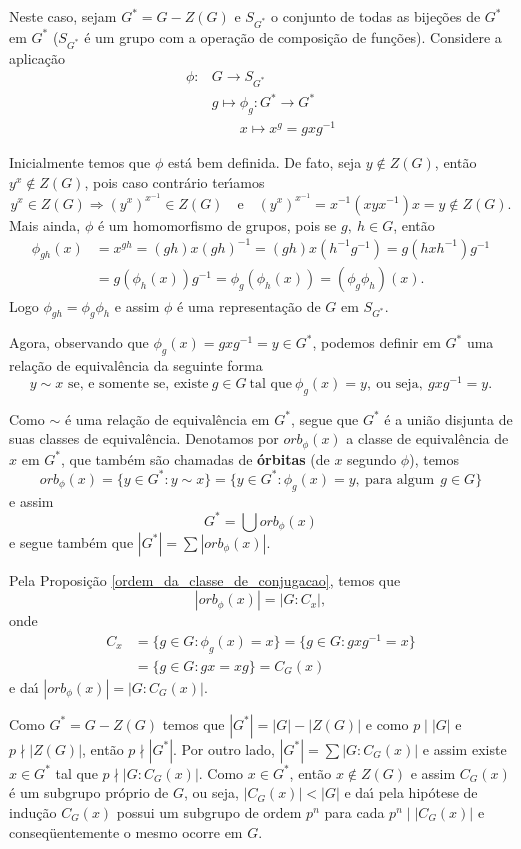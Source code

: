 \begin{prova}
Neste caso, sejam $G^* = G - Z(G)$ e $S_{G^*}$ o conjunto de todas as
bije{\c c}{\~o}es de $G^*$ em $G^*$ ($S_{G^*}$ {\'e} um grupo com a opera{\c
c}{\~a}o de composi{\c c}{\~a}o de fun{\c c}{\~o}es). Considere a
aplica{\c c}{\~a}o
\begin{align*}
\phi : & G \to S_{G^*}\\
&g \mapsto \phi_g : G^* \to G^*\\
&\qquad x \mapsto x^g = gxg^{-1}
\end{align*}

Inicialmente temos que $\phi$ est{\'a} bem definida. De fato, seja $y \notin
Z(G)$, ent{\~a}o $y^x \notin Z(G)$, pois caso contr{\'a}rio
ter{\'\i}amos
\[
y^x \in Z(G) \Rightarrow (y^x)^{x^{-1}} \in Z(G) \quad
\text{e}\quad (y^x)^{x^{-1}} = x^{-1}(xyx^{-1})x = y \notin Z(G).
\]
Mais ainda, $\phi$ {\'e} um homomorfismo de grupos, pois se $g,\ h \in G$,
ent{\~a}o 
\begin{align*}
\phi_{gh} (x) &= x^{gh} =
(gh)x(gh)^{-1} = (gh)x(h^{-1}g^{-1}) = g(hxh^{-1})g^{-1} \\&=
g(\phi_h (x))g^{-1} = \phi_g (\phi_h (x)) = (\phi_g \phi_h)(x).
\end{align*}
Logo $\phi_{gh} = \phi_g \phi_h$ e assim $\phi$ {\'e} uma representa{\c
  c}{\~a}o de $G$ em $S_{G^*}$.

Agora, observando que $\phi_g(x) = gxg^{-1} = y \in G^*$, podemos definir em
$G^*$ uma rela{\c c}{\~a}o de equival{\^e}ncia da seguinte forma
\[
y \sim x \mbox{ se, e somente se, existe}\ g \in G\ \mbox{tal que}\ \phi_g (x) = y,\
\text{ou seja},\ gxg^{-1} = y.
\]

Como $\sim$ {\'e} uma rela{\c c}{\~a}o de equival{\^e}ncia em $G^*$, segue
que $G^*$ {\'e} a uni{\~a}o disjunta de suas classes de
equival{\^e}ncia. Denotamos por $orb_\phi (x)$ a classe de equival{\^e}ncia
de $x$ em $G^*$, que tamb{\'e}m s{\~a}o chamadas de \textbf{{\'o}rbitas} (de
$x$ segundo $\phi$), temos
\[
orb_\phi (x) = \{y \in G^* : y \sim x \} = \{y
\in G^* : \phi_g (x) = y,\ \mbox{para algum}\ \ g \in G \}
\]
e assim 
\[
G^* = \bigcup orb_\phi (x)
\] e segue tamb{\'e}m que $|G^*| = \sum |orb_\phi
(x)|$.

Pela Proposi\c{c}\~ao \ref{ordem_da_classe_de_conjugacao}, temos que
\[
|orb_\phi (x)| = |G : C_x|,
\]
onde
\begin{align*}
C_x &= \{g \in G : \phi_g (x) = x \} = \{g \in G
: gxg^{-1} = x \} \\
&= \{g \in G : gx = xg \} = C_G (x)
\end{align*}
e da{\'\i} $|orb_\phi (x)| = |G : C_G (x)|$.

Como $G^* = G - Z(G)$ temos que $|G^*| = |G| - |Z(G)|$ e como $p \mid |G|$ e
$p \nmid |Z(G)|$, ent{\~a}o $p \nmid |G^*|$. Por outro lado, $|G^*| = \sum
|G : C_G(x)|$ e assim existe $x \in G^*$ tal que $p \nmid |G :
C_G(x)|$. Como $x \in G^*$, ent{\~a}o $x \notin Z(G)$ e assim $C_G(x)$ {\'e}
um subgrupo pr{\'o}prio de $G$, ou seja, $|C_G(x)| < |G|$ e da{\'\i} pela
hip{\'o}tese de indu{\c c}{\~a}o $C_G(x)$ possui um subgrupo de ordem $p^n$
para cada $p^n \mid |C_G(x)|$ e conseq{\"u}entemente o mesmo ocorre em $G$.
\end{prova}

